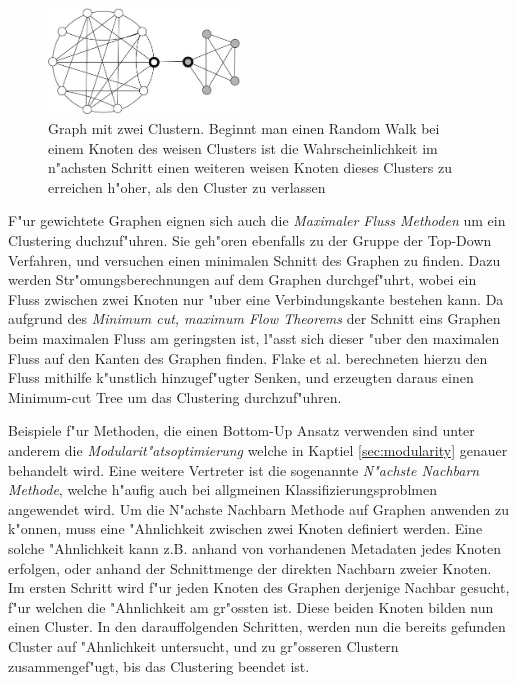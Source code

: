 \documentclass[journal]{vgtc}
\begin{document}
    \begin{figure}[h]
    \centering
    \includegraphics[width=2in]{images/random_walk}
    \caption{\label{fig:random_walk} Graph mit zwei Clustern. Beginnt man einen Random Walk bei einem Knoten des weisen Clusters
	      ist die Wahrscheinlichkeit im n"achsten Schritt einen weiteren weisen Knoten dieses Clusters zu erreichen h"oher,
	      als den Cluster zu verlassen \cite{Schaeffer}}
    \end{figure}
    
  F"ur gewichtete Graphen eignen sich auch die \emph{Maximaler Fluss Methoden} um ein Clustering duchzuf"uhren. Sie
  geh"oren ebenfalls zu der Gruppe der Top-Down Verfahren, und versuchen einen minimalen Schnitt \cite{Schaeffer} des Graphen zu finden. 
  Dazu werden Str"omungsberechnungen auf dem Graphen durchgef"uhrt, wobei ein Fluss zwischen zwei Knoten nur "uber eine Verbindungskante bestehen kann.
  Da aufgrund des \emph{Minimum cut, maximum Flow Theorems} der Schnitt eins Graphen beim maximalen Fluss am geringsten ist, l"asst sich dieser "uber
  den maximalen Fluss auf den Kanten des Graphen finden. Flake et al.\cite{flake} berechneten hierzu den Fluss mithilfe k"unstlich hinzugef"ugter
  Senken, und erzeugten daraus einen Minimum-cut Tree\cite{minimum_cut_tree} um das Clustering durchzuf"uhren.
  
  Beispiele f"ur Methoden, die einen Bottom-Up Ansatz verwenden sind unter anderem die \emph{Modularit"atsoptimierung} welche
  in Kaptiel \ref{sec:modularity} genauer behandelt wird. Eine weitere Vertreter ist die sogenannte \emph{N"achste Nachbarn Methode}\cite{Schaeffer}, welche
  h"aufig auch bei allgmeinen Klassifizierungsproblmen angewendet wird. Um die N"achste Nachbarn Methode auf Graphen anwenden
  zu k"onnen, muss eine "Ahnlichkeit zwischen zwei Knoten definiert werden. Eine solche "Ahnlichkeit
  kann z.B. anhand von vorhandenen Metadaten jedes Knoten erfolgen, oder anhand der Schnittmenge der direkten Nachbarn zweier
  Knoten. Im ersten Schritt wird f"ur jeden Knoten des Graphen derjenige Nachbar gesucht, f"ur welchen die "Ahnlichkeit am gr"ossten ist.
  Diese beiden Knoten bilden nun einen Cluster. In den darauffolgenden Schritten, werden nun die bereits gefunden Cluster auf "Ahnlichkeit
  untersucht, und zu gr"osseren Clustern zusammengef"ugt, bis das Clustering beendet ist.
  
\end{document}
